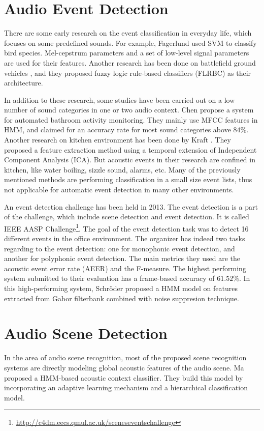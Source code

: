\section{Audio Event Detection}
There are some early research on the event classification in everyday life, which focuses on some predefined sounds. 
For example, Fagerlund \cite{fagerlund2007bird} used SVM to classify bird species. 
Mel-cepstrum parameters and a set of low-level signal parameters are used for their features. 
Another research has been done on battlefield ground vehicles \cite{wu2007classification}, and they proposed fuzzy logic rule-based classifiers (FLRBC) as their architecture.

In addition to these research, some studies have been carried out on a low number of sound categories in one or two audio context. 
Chen \cite{chen2005bathroom} propose a system for automated bathroom activity monitoring. 
They mainly use MFCC features in HMM, and claimed for an accuracy rate for most sound categories above $84\%$. 
Another research on kitchen environment has been done by Kraft \cite{kraft2005temporal}. 
They proposed a feature extraction method using a temporal extension of Independent Component Analysis (ICA). 
But acoustic events in their research are confined in kitchen, like water boiling, sizzle sound, alarms, etc. 
Many of the previously mentioned methods are performing classification in a small size event lists, thus not applicable for automatic event detection in many other environments. 
 
An event detection challenge has been held in 2013. 
The event detection is a part of the challenge, which include scene detection and event detection.  
It is called IEEE AASP Challenge\footnote{\url{http://c4dm.eecs.qmul.ac.uk/sceneseventschallenge}}. 
The goal of the event detection task was to detect 16 different events in the office environment. 
The organizer has indeed two tasks regarding to the event detection: one for monophonic event detection, and another for polyphonic event detection.  
The main metrics they used are the acoustic event error rate (AEER) \cite{giannoulis2013ieee} and the F-measure.
The highest performing system submitted to their evaluation has a frame-based accuracy of $61.52\%$. 
In this high-performing system, Schr\"{o}der \cite{schroder2013acoustic} proposed a HMM model on features extracted from Gabor filterbank combined with noise suppresion technique. 

\section{Audio Scene Detection}
In the area of audio scene recognition, most of the proposed scene recognition systems are directly modeling global acoustic features of the audio scene. 
Ma \cite{ma2006acoustic} proposed a HMM-based acoustic context classifier. 
They build this model by incorporating an adaptive learning mechanism and a hierarchical classification model.  

